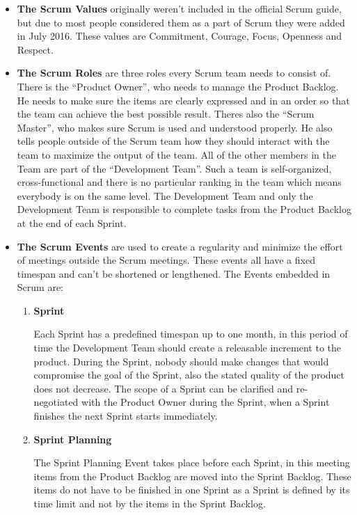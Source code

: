 \begin{itemize}
    \item \textbf{The Scrum Values} originally weren't included in the official Scrum guide, but due to most people considered them as a part of Scrum they were added in July 2016. These values are Commitment, Courage, Focus, Openness and Respect.

    \item \textbf{The Scrum Roles} are three roles every Scrum team needs to consist of. There is the ``Product Owner'', who needs to manage the Product Backlog. He needs to make sure the items are clearly expressed and in an order so that the team can achieve the best possible result. Theres also the ``Scrum Master'', who makes sure Scrum is used and understood properly. He also tells people outside of the Scrum team how they should interact with the team to maximize the output of the team. All of the other members in the Team are part of the ``Development Team''. Such a team is self-organized, cross-functional and there is no particular ranking in the team which means everybody is on the same level. The Development Team and only the Development Team is responsible to complete tasks from the Product Backlog at the end of each Sprint.

    \item \textbf{The Scrum Events} are used to create a regularity and minimize the effort of meetings outside the Scrum meetings. These events all have a fixed timespan and can't be shortened or lengthened. The Events embedded in Scrum are:
    \begin{enumerate}
        \item \textbf{Sprint}

        Each Sprint has a predefined timespan up to one month, in this period of time the Development Team should create a releasable increment to the product. During the Sprint, nobody should make changes that would compromise the goal of the Sprint, also the stated quality of the product does not decrease. The scope of a Sprint can be clarified and re-negotiated with the Product Owner during the Sprint, when a Sprint finishes the next Sprint starts immediately.

        \item \textbf{Sprint Planning}

        The Sprint Planning Event takes place before each Sprint, in this meeting items from the Product Backlog are moved into the Sprint Backlog. These items do not have to be finished in one Sprint as a Sprint is defined by its time limit and not by the items in the Sprint Backlog.


\end{enumerate}
\end{itemize}
